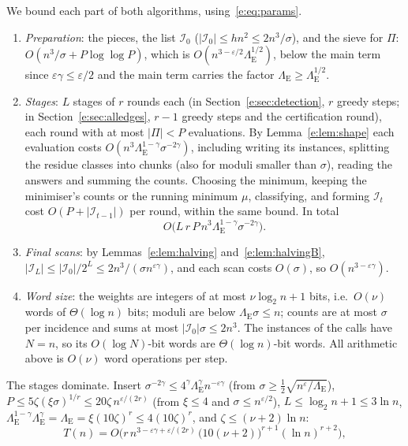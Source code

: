 \documentclass[11pt]{article}
\theoremstyle{definition}
\theoremstyle{remark}
\newcommand{\Iq}{\mathcal{I}}
\begin{document}
We bound each part of both algorithms, using~\eqref{e:eq:params}.
\begin{enumerate}[label=(\roman*)]
\item \emph{Preparation}: the pieces, the list $\Iq_0$ ($|\Iq_0|\le hn^2\le2n^3/\sigma$), and the sieve for $\Pi$: $O(n^3/\sigma+P\log\log P)$, which is $O(n^{3-\varepsilon/2}\Lambda_{\mathrm E}^{1/2})$, below the main term since $\varepsilon\gamma\le\varepsilon/2$ and the main term carries the factor $\Lambda_{\mathrm E}\ge\Lambda_{\mathrm E}^{1/2}$.
\item \emph{Stages}: $L$ stages of $r$ rounds each (in Section~\ref{e:sec:detection}, $r$ greedy steps; in Section~\ref{e:sec:alledges}, $r-1$ greedy steps and the certification round), each round with at most $|\Pi|<P$ evaluations. By Lemma~\ref{e:lem:shape} each evaluation costs $O(n^3\Lambda_{\mathrm E}^{1-\gamma}\sigma^{-2\gamma})$, including writing its instances, splitting the residue classes into chunks (also for moduli smaller than $\sigma$), reading the answers and summing the counts. Choosing the minimum, keeping the minimiser's counts or the running minimum $\mu$, classifying, and forming $\Iq_t$ cost $O(P+|\Iq_{t-1}|)$ per round, within the same bound. In total
\[
O\big(L\,r\,P\,n^3\Lambda_{\mathrm E}^{1-\gamma}\sigma^{-2\gamma}\big).
\]
\item \emph{Final scans}: by Lemmas~\ref{e:lem:halving} and~\ref{e:lem:halvingB}, $|\Iq_L|\le|\Iq_0|/2^L\le2n^3/(\sigma n^{\varepsilon\gamma})$, and each scan costs $O(\sigma)$, so $O(n^{3-\varepsilon\gamma})$.
\item \emph{Word size}: the weights are integers of at most $\nu\log_2n+1$ bits, i.e.\ $O(\nu)$ words of $\Theta(\log n)$ bits; moduli are below $\Lambda_{\mathrm E}\sigma\le n$; counts are at most $\sigma$ per incidence and sums at most $|\Iq_0|\sigma\le2n^3$. The instances of the calls have $N=n$, so its $O(\log N)$-bit words are $\Theta(\log n)$-bit words. All arithmetic above is $O(\nu)$ word operations per step.
\end{enumerate}
The stages dominate. Insert $\sigma^{-2\gamma}\le4^\gamma\Lambda_{\mathrm E}^\gamma n^{-\varepsilon\gamma}$ (from $\sigma\ge\frac12\sqrt{n^\varepsilon/\Lambda_{\mathrm E}}$), $P\le5\zeta(\xi\sigma)^{1/r}\le20\zeta\,n^{\varepsilon/(2r)}$ (from $\xi\le4$ and $\sigma\le n^{\varepsilon/2}$), $L\le\log_2n+1\le3\ln n$, $\Lambda_{\mathrm E}^{1-\gamma}\Lambda_{\mathrm E}^\gamma=\Lambda_{\mathrm E}=\xi(10\zeta)^r\le4(10\zeta)^r$, and $\zeta\le(\nu+2)\ln n$:
\begin{equation}\label{e:eq:total}
T(n)=O\Big(r\,n^{3-\varepsilon\gamma+\varepsilon/(2r)}\,\big(10(\nu+2)\big)^{r+1}(\ln n)^{r+2}\Big),
\end{equation}
\end{document}
